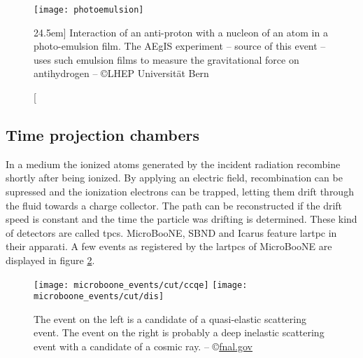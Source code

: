 \begin{figure}
  \centering
  \texttt{[image: photoemulsion]}
  \caption[][24.5em]{%
    Interaction of an anti-proton with a nucleon of an atom in a photo-emulsion film.
    The AEgIS experiment -- source of this event -- uses such emulsion films to measure the gravitational force on antihydrogen
    -- \copyright LHEP Universität Bern
  }
  \label{fig:photoemulsion}
\end{figure}

\subsection{Time projection chambers} In a medium the ionized atoms generated by the incident radiation recombine shortly after being ionized.
By applying an electric field, recombination can be supressed and the ionization electrons can be trapped, letting them drift through the fluid towards a charge collector.
The path can be reconstructed if the drift speed is constant and the time the particle was drifting is determined.
These kind of detectors are called \glspl{tpc}.
MicroBooNE, SBND and Icarus feature \gls{lartpc} in their apparati.
A few events as registered by the \glspl{lartpc} of MicroBooNE are displayed in figure \ref{fig:events_microboone}.

\begin{figure}
  \centering
  \texttt{[image: microboone\_events/cut/ccqe]}
  \hspace*{.5em}
  \texttt{[image: microboone\_events/cut/dis]}
  \caption{%
    The event on the left is a candidate of a quasi-elastic scattering event.
    The event on the right is probably a deep inelastic scattering event with a candidate of a cosmic ray.
    -- \copyright \href{http://www-microboone.fnal.gov/first-neutrinos/index.html}{fnal.gov}
  }
  \label{fig:events_microboone}
\end{figure}
